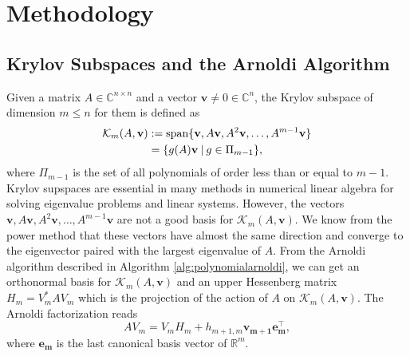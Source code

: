 \section{Methodology}
\label{sec:methods}

\subsection{Krylov Subspaces and the Arnoldi Algorithm}\label{sec:arnoldi}
Given a matrix $A \in \mathbb{C}^{n \times n}$ and a vector $\mathbf{v} \neq 0 \in \mathbb{C}^n$,
the Krylov subspace of dimension $m \leq n$ for them is defined \cite{golub2013matrix} as
\begin{equation}
    \label{eq:krylovsubspacedefinition}
    \begin{aligned}
        \mathcal{K}_m(A, \mathbf{v})
        & :=\operatorname{span}\{\mathbf{v}, A\mathbf{v}, A^{2}\mathbf{v}, \dots, A^{m-1}\mathbf{v} \}\\
         & = \{g(A)\mathbf{v} \:|\: g \in \Pi_{m-1} \},
    \end{aligned}
\end{equation}
where $\Pi_{m-1}$ is the set of all polynomials of order less than or equal to $m-1$.
Krylov supspaces are essential in many methods in numerical linear algebra
for solving eigenvalue problems and linear systems.
However, the vectors $\mathbf{v}, A\mathbf{v}, A^{2}\mathbf{v}, \dots, A^{m-1}\mathbf{v}$
are not a good basis for $\mathcal{K}_m(A, \mathbf{v})$. We know from the power method that
these vectors have almost the same direction and converge to the eigenvector paired
with the largest eigenvalue of $A$.
From the Arnoldi algorithm \cite{trefethen1997numerical} described in Algorithm
\ref{alg:polynomialarnoldi}, we can get an orthonormal basis for $\mathcal{K}_m(A, \mathbf{v})$
and an upper Hessenberg matrix $H_m = V_m^* A V_m$ which is the projection of the action of
$A$ on $\mathcal{K}_m(A, \mathbf{v})$. The Arnoldi factorization reads
\begin{equation}
    \label{eq:arnoldifactorization}
    A V_m = V_m H_m + h_{m+1, m} \mathbf{v_{m+1}} \mathbf{e_m^\top},
\end{equation}
where $\mathbf{e_m}$ is the last canonical basis vector of $\mathbb{R}^{m}$.

